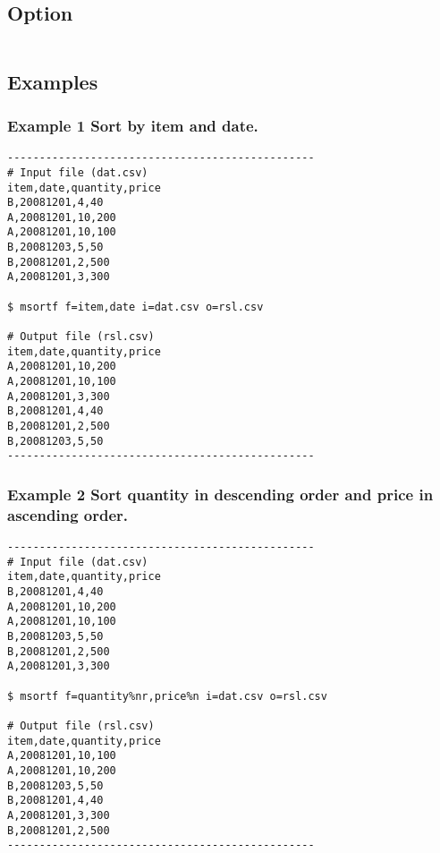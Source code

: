 \documentclass[a4paper]{jarticle}
\begin{document}
\subsection*{Option}
\begin{table}[htbp]
{\small
\begin{tabular}{ll}
\end{tabular} 
}
\end{table} 

\subsection*{Examples}
\subsubsection*{Example 1 Sort by item and date.
}
\renewcommand{\tablename}{table }

\begin{verbatim}
------------------------------------------------
# Input file (dat.csv)
item,date,quantity,price
B,20081201,4,40
A,20081201,10,200
A,20081201,10,100
B,20081203,5,50
B,20081201,2,500
A,20081201,3,300

$ msortf f=item,date i=dat.csv o=rsl.csv

# Output file (rsl.csv)
item,date,quantity,price
A,20081201,10,200
A,20081201,10,100
A,20081201,3,300
B,20081201,4,40
B,20081201,2,500
B,20081203,5,50
------------------------------------------------
\end{verbatim}

\subsubsection*{Example 2 Sort quantity in descending order and price in ascending order.
}

\begin{verbatim}
------------------------------------------------
# Input file (dat.csv)
item,date,quantity,price
B,20081201,4,40
A,20081201,10,200
A,20081201,10,100
B,20081203,5,50
B,20081201,2,500
A,20081201,3,300

$ msortf f=quantity%nr,price%n i=dat.csv o=rsl.csv

# Output file (rsl.csv)
item,date,quantity,price
A,20081201,10,100
A,20081201,10,200
B,20081203,5,50
B,20081201,4,40
A,20081201,3,300
B,20081201,2,500
------------------------------------------------
\end{verbatim}
\end{document}
